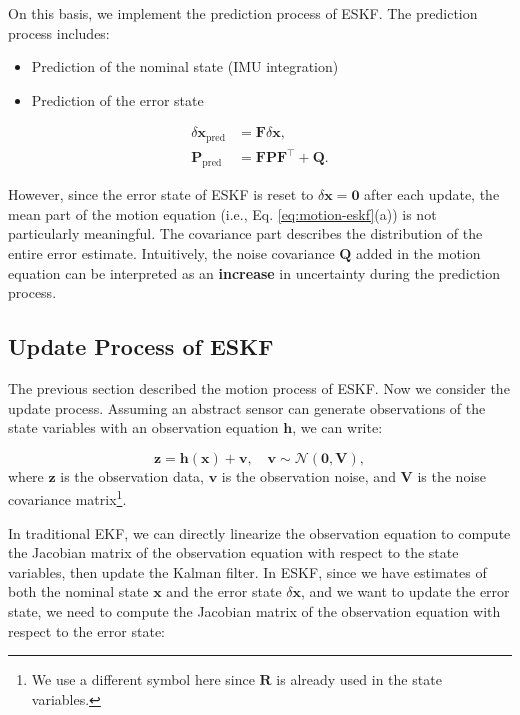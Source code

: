 On this basis, we implement the prediction process of ESKF. The prediction process includes:
\begin{itemize}
	\item Prediction of the nominal state (IMU integration)
	\item Prediction of the error state
\end{itemize}
\begin{subequations}\label{eq:motion-eskf}
	\begin{align}
		\delta \mathbf{x}_{\mathrm{pred}} &= \mathbf{F} \delta \mathbf{x}, \\
		\mathbf{P}_{\mathrm{pred}} &= \mathbf{F} \mathbf{P} \mathbf{F}^\top + \mathbf{Q}.
	\end{align}
\end{subequations}

However, since the error state of ESKF is reset to $\delta \mathbf{x} = \mathbf{0}$ after each update, the mean part of the motion equation (i.e., Eq. \eqref{eq:motion-eskf}(a)) is not particularly meaningful. The covariance part describes the distribution of the entire error estimate. Intuitively, the noise covariance $\mathbf{Q}$ added in the motion equation can be interpreted as an \textbf{increase} in uncertainty during the prediction process.

\subsection{Update Process of ESKF}
\label{subsec:3.4.4}
The previous section described the motion process of ESKF. Now we consider the update process. Assuming an abstract sensor can generate observations of the state variables with an observation equation $\mathbf{h}$, we can write:

\begin{equation}\label{eq:observation-model}
	\mathbf{z} = \mathbf{h}(\mathbf{x}) + \mathbf{v}, \quad \mathbf{v} \sim \mathcal{N}(\mathbf{0}, \mathbf{V}),
\end{equation}
where $\mathbf{z}$ is the observation data, $\mathbf{v}$ is the observation noise, and $\mathbf{V}$ is the noise covariance matrix\footnote{We use a different symbol here since $\mathbf{R}$ is already used in the state variables.}.

In traditional EKF, we can directly linearize the observation equation to compute the Jacobian matrix of the observation equation with respect to the state variables, then update the Kalman filter. In ESKF, since we have estimates of both the nominal state $\mathbf{x}$ and the error state $\delta \mathbf{x}$, and we want to update the error state, we need to compute the Jacobian matrix of the observation equation with respect to the error state:

